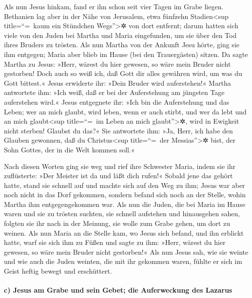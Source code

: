  Als nun Jesus hinkam, fand er ihn schon seit vier Tagen
im Grabe liegen.  Bethanien lag aber in der Nähe von
Jerusalem, etwa fünfzehn Stadien\textless sup title=``=~kaum ein
Stündchen Wegs''\textgreater✲ von dort entfernt;  darum
hatten sich viele von den Juden bei Martha und Maria eingefunden, um sie
über den Tod ihres Bruders zu trösten.  Als nun Martha
von der Ankunft Jesu hörte, ging sie ihm entgegen; Maria aber blieb im
Hause (bei den Trauergästen) sitzen.  Da sagte Martha zu
Jesus: »Herr, wärest du hier gewesen, so wäre mein Bruder nicht
gestorben!  Doch auch so weiß ich, daß Gott dir alles
gewähren wird, um was du Gott bittest.«  Jesus erwiderte
ihr: »Dein Bruder wird auferstehen!«  Martha antwortete
ihm: »Ich weiß, daß er bei der Auferstehung am jüngsten Tage auferstehen
wird.«  Jesus entgegnete ihr: »Ich bin die Auferstehung
und das Leben; wer an mich glaubt, wird leben, wenn er auch stirbt,
 und wer da lebt und an mich glaubt\textless sup
title=``=~im Leben an mich glaubt''\textgreater✲, wird in Ewigkeit nicht
sterben! Glaubst du das?«  Sie antwortete ihm: »Ja, Herr,
ich habe den Glauben gewonnen, daß du Christus\textless sup
title=``=~der Messias''\textgreater✲ bist, der Sohn Gottes, der in die
Welt kommen soll.«

 Nach diesen Worten ging sie weg und rief ihre Schwester
Maria, indem sie ihr zuflüsterte: »Der Meister ist da und läßt dich
rufen!«  Sobald jene das gehört hatte, stand sie schnell
auf und machte sich auf den Weg zu ihm;  Jesus war aber
noch nicht in das Dorf gekommen, sondern befand sich noch an der Stelle,
wohin Martha ihm entgegengekommen war.  Als nun die
Juden, die bei Maria im Hause waren und sie zu trösten suchten, sie
schnell aufstehen und hinausgehen sahen, folgten sie ihr nach in der
Meinung, sie wolle zum Grabe gehen, um dort zu weinen. 
Als nun Maria an die Stelle kam, wo Jesus sich befand, und ihn erblickt
hatte, warf sie sich ihm zu Füßen und sagte zu ihm: »Herr, wärest du
hier gewesen, so wäre mein Bruder nicht gestorben!«  Als
nun Jesus sah, wie sie weinte und wie auch die Juden weinten, die mit
ihr gekommen waren, fühlte er sich im Geist heftig bewegt und
erschüttert.

\hypertarget{c-jesus-am-grabe-und-sein-gebet-die-auferweckung-des-lazarus}{%
\paragraph{c) Jesus am Grabe und sein Gebet; die Auferweckung des
Lazarus}\label{c-jesus-am-grabe-und-sein-gebet-die-auferweckung-des-lazarus}}

